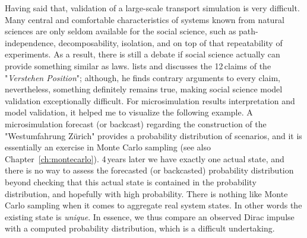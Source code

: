 Having said that, validation of a large-scale transport simulation is very difficult. Many central and comfortable characteristics of systems known from natural sciences are only seldom available for the social science, such as path-independence, decomposability, isolation, and on top of that repeatability of experiments. As a result, there is still a debate if social science actually can provide something similar as laws. \citet[][p.107ff]{Abel_1976} lists and discusses the 12\,claims of the "\emph{Verstehen Position}"; although, he finds contrary arguments to every claim, nevertheless, something definitely remains true, making social science model validation exceptionally difficult. For microsimulation results interpretation and model validation, it helped me to visualize the following example. A microsimulation forecast (or backcast) regarding the construction of the "Westumfahrung Zürich" provides a probability distribution of scenarios, and it is essentially an exercise in Monte Carlo sampling (see also Chapter~\ref{ch:montecarlo}). 4\,years later we have exactly one actual state, and there is no way to assess the forecasted (or backcasted) probability distribution beyond checking that this actual state is contained in the probability distribution, and hopefully with high probability. There is nothing like Monte Carlo sampling when it comes to aggregate real system states. In other words the existing state is \emph{unique}. In essence, we thus compare an observed Dirac impulse with a computed probability distribution, which is a difficult undertaking.

